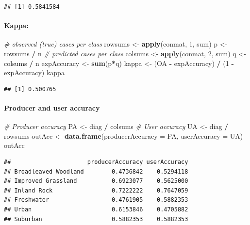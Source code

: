 \documentclass[]{article}
\newenvironment{Shaded}{\begin{snugshade}}{\end{snugshade}}
\newcommand{\CommentTok}[1]{\textcolor[rgb]{0.56,0.35,0.01}{\textit{#1}}}
\newcommand{\DataTypeTok}[1]{\textcolor[rgb]{0.13,0.29,0.53}{#1}}
\newcommand{\DecValTok}[1]{\textcolor[rgb]{0.00,0.00,0.81}{#1}}
\newcommand{\KeywordTok}[1]{\textcolor[rgb]{0.13,0.29,0.53}{\textbf{#1}}}
\newcommand{\NormalTok}[1]{#1}
\newcommand{\OperatorTok}[1]{\textcolor[rgb]{0.81,0.36,0.00}{\textbf{#1}}}
\newcommand{\StringTok}[1]{\textcolor[rgb]{0.31,0.60,0.02}{#1}}
\let\oldparagraph\paragraph
\renewcommand{\paragraph}[1]{\oldparagraph{#1}\mbox{}}
\begin{document}
\begin{verbatim}
## [1] 0.5841584
\end{verbatim}

\hypertarget{kappa}{%
\paragraph{Kappa:}\label{kappa}}

\begin{Shaded}
\begin{Highlighting}[]
\CommentTok{# observed (true) cases per class}
\NormalTok{rowsums <-}\StringTok{ }\KeywordTok{apply}\NormalTok{(conmat, }\DecValTok{1}\NormalTok{, sum)}
\NormalTok{p <-}\StringTok{ }\NormalTok{rowsums }\OperatorTok{/}\StringTok{ }\NormalTok{n}
\CommentTok{# predicted cases per class}
\NormalTok{colsums <-}\StringTok{ }\KeywordTok{apply}\NormalTok{(conmat, }\DecValTok{2}\NormalTok{, sum)}
\NormalTok{q <-}\StringTok{ }\NormalTok{colsums }\OperatorTok{/}\StringTok{ }\NormalTok{n}
\NormalTok{expAccuracy <-}\StringTok{ }\KeywordTok{sum}\NormalTok{(p}\OperatorTok{*}\NormalTok{q)}
\NormalTok{kappa <-}\StringTok{ }\NormalTok{(OA }\OperatorTok{-}\StringTok{ }\NormalTok{expAccuracy) }\OperatorTok{/}\StringTok{ }\NormalTok{(}\DecValTok{1} \OperatorTok{-}\StringTok{ }\NormalTok{expAccuracy)}
\NormalTok{kappa}
\end{Highlighting}
\end{Shaded}

\begin{verbatim}
## [1] 0.500765
\end{verbatim}

\hypertarget{producer-and-user-accuracy}{%
\paragraph{Producer and user
accuracy}\label{producer-and-user-accuracy}}

\begin{Shaded}
\begin{Highlighting}[]
\CommentTok{# Producer accuracy}
\NormalTok{PA <-}\StringTok{ }\NormalTok{diag }\OperatorTok{/}\StringTok{ }\NormalTok{colsums}
\CommentTok{# User accuracy}
\NormalTok{UA <-}\StringTok{ }\NormalTok{diag }\OperatorTok{/}\StringTok{ }\NormalTok{rowsums}
\NormalTok{outAcc <-}\StringTok{ }\KeywordTok{data.frame}\NormalTok{(}\DataTypeTok{producerAccuracy =}\NormalTok{ PA, }\DataTypeTok{userAccuracy =}\NormalTok{ UA)}
\NormalTok{outAcc}
\end{Highlighting}
\end{Shaded}

\begin{verbatim}
##                      producerAccuracy userAccuracy
## Broadleaved Woodland        0.4736842    0.5294118
## Improved Grassland          0.6923077    0.5625000
## Inland Rock                 0.7222222    0.7647059
## Freshwater                  0.4761905    0.5882353
## Urban                       0.6153846    0.4705882
## Suburban                    0.5882353    0.5882353
\end{verbatim}
\end{document}
